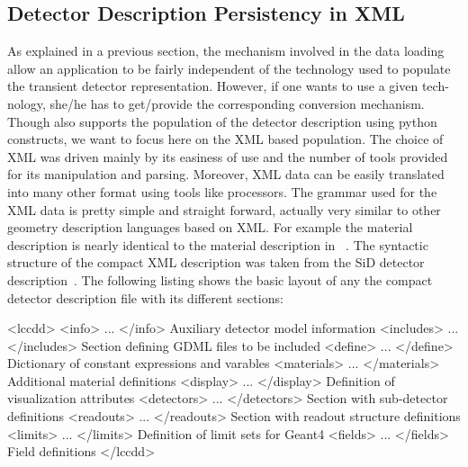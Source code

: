 \documentclass[10pt,a4paper]{article}
\begin{document}
\newpage
\subsection{Detector Description Persistency in XML}
\label{sec:compact-xml-structure}
\noindent
As explained in a previous section, the mechanism involved in the data loading 
allow an application to be fairly independent of the technology used to populate
the transient detector representation. However, if one wants to use a given tech-
nology, she/he has to get/provide the corresponding conversion mechanism.
Though \DDhep also supports the population of the detector description using 
python constructs, we want to focus here on the XML based population.
The choice of XML was driven mainly by its easiness of use and the number 
of tools provided for its manipulation and parsing. Moreover, XML data
can be easily translated into many other format using tools like  
processors.
The grammar used for the XML data is pretty simple and straight forward, 
actually very similar to other geometry description languages based
on XML. For example the material description is nearly identical
to the material description in ~\cite{bib:GDML}.
The syntactic structure of the compact XML description was taken from
the SiD detector description~\cite{bib:Detector}.
The following listing shows the basic layout of any
the compact detector description file with its different sections:

\begin{code}
<lccdd>
    <info>          ...    </info>             Auxiliary detector model information
    <includes>      ...    </includes>         Section defining GDML files to be included
    <define>        ...    </define>           Dictionary of constant expressions and varables
    <materials>     ...    </materials>        Additional material definitions
    <display>       ...    </display>          Definition of visualization attributes
    <detectors>     ...    </detectors>        Section with sub-detector definitions
    <readouts>      ...    </readouts>         Section with readout structure definitions
    <limits>        ...    </limits>           Definition of limit sets for Geant4
    <fields>        ...    </fields>           Field definitions
</lccdd>
\end{code}
\end{document}
